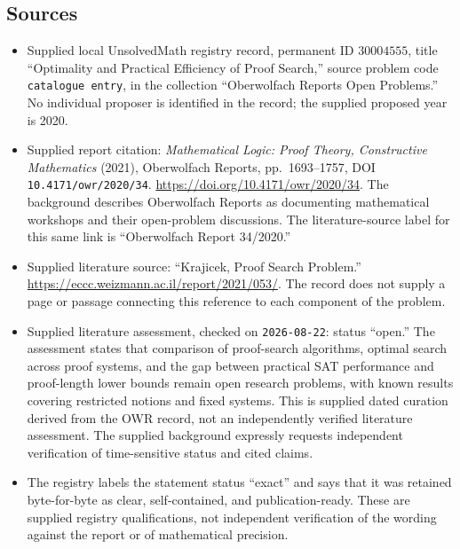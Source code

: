 \documentclass[11pt]{article}
\begin{document}
\subsection{Sources}
\begin{itemize}
\item Supplied local UnsolvedMath registry record, permanent ID \(30004555\), title ``Optimality and Practical Efficiency of Proof Search,'' source problem code \texttt{catalogue entry}, in the collection ``Oberwolfach Reports Open Problems.'' No individual proposer is identified in the record; the supplied proposed year is 2020.
\item Supplied report citation: \emph{Mathematical Logic: Proof Theory, Constructive Mathematics} (2021), Oberwolfach Reports, pp.\ 1693--1757, DOI \texttt{10.4171/owr/2020/34}. \url{https://doi.org/10.4171/owr/2020/34}. The background describes Oberwolfach Reports as documenting mathematical workshops and their open-problem discussions. The literature-source label for this same link is ``Oberwolfach Report 34/2020.''
\item Supplied literature source: ``Krajicek, Proof Search Problem.'' \url{https://eccc.weizmann.ac.il/report/2021/053/}. The record does not supply a page or passage connecting this reference to each component of the problem.
\item Supplied literature assessment, checked on \texttt{2026-08-22}: status ``open.'' The assessment states that comparison of proof-search algorithms, optimal search across proof systems, and the gap between practical SAT performance and proof-length lower bounds remain open research problems, with known results covering restricted notions and fixed systems. This is supplied dated curation derived from the OWR record, not an independently verified literature assessment. The supplied background expressly requests independent verification of time-sensitive status and cited claims.
\item The registry labels the statement status ``exact'' and says that it was retained byte-for-byte as clear, self-contained, and publication-ready. These are supplied registry qualifications, not independent verification of the wording against the report or of mathematical precision.
\end{itemize}
\end{document}

